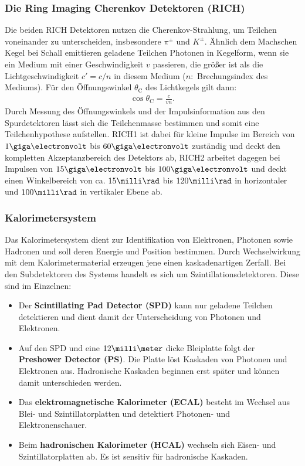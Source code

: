 \subsubsection{Die Ring Imaging Cherenkov Detektoren (RICH)}
Die beiden RICH Detektoren nutzen die Cherenkov-Strahlung, um Teilchen voneinander zu unterscheiden, insbesondere $\pi^{\pm}$ und $K^{\pm}$. Ähnlich dem Machschen Kegel bei Schall emittieren geladene Teilchen Photonen in Kegelform, wenn sie ein Medium mit einer Geschwindigkeit $v$ passieren, die größer ist als die Lichtgeschwindigkeit $c'=c/n$ in diesem Medium ($n:$ Brechungsindex des Mediums). Für den Öffnungswinkel $\theta_{\text{C}}$ des Lichtkegels gilt dann:
\begin{align}
\cos \theta_{\text{C}} = \frac{c}{vn}.
\end{align}
Durch Messung des Öffnungswinkels und der Impulsinformation aus den Spurdetektoren lässt sich die Teilchenmasse bestimmen und somit eine Teilchenhypothese aufstellen. RICH1 ist dabei für kleine Impulse im Bereich von $1\giga\electronvolt$ bis $60\giga\electronvolt$ zuständig und deckt den kompletten Akzeptanzbereich des Detektors ab, RICH2 arbeitet dagegen bei Impulsen von $15\giga\electronvolt$ bis $100\giga\electronvolt$ und deckt einen Winkelbereich von ca. $15\milli\rad$ bis $120\milli\rad$ in horizontaler und $100\milli\rad$ in vertikaler Ebene ab.

\subsubsection{Kalorimetersystem}
Das Kalorimetersystem dient zur Identifikation von Elektronen, Photonen sowie Hadronen und soll deren Energie und Position bestimmen. Durch Wechselwirkung mit dem Kalorimetermaterial erzeugen jene einen kaskadenartigen Zerfall. Bei den Subdetektoren des Systems handelt es sich um Szintillationsdetektoren. Diese sind im Einzelnen:
\begin{itemize}
\item Der \textbf{Scintillating Pad Detector (SPD)} kann nur geladene Teilchen detektieren und dient damit der Unterscheidung von Photonen und Elektronen.
\item Auf den SPD und eine $12\milli\meter$ dicke Bleiplatte folgt der \textbf{Preshower Detector (PS)}. Die Platte löst Kaskaden von Photonen und Elektronen aus. Hadronische Kaskaden beginnen erst später und können damit unterschieden werden.
\item Das \textbf{elektromagnetische Kalorimeter (ECAL)} besteht im Wechsel aus Blei- und Szintillatorplatten und detektiert Photonen- und Elektronenschauer.
\item Beim \textbf{hadronischen Kalorimeter (HCAL)} wechseln sich Eisen- und Szintillatorplatten ab. Es ist sensitiv für hadronische Kaskaden.
\end{itemize}

